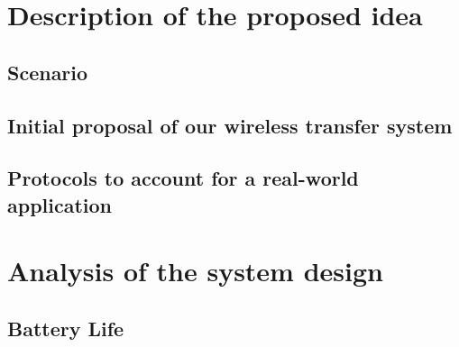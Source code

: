 \documentclass[a4paper, 10pt]{article}
\begin{document}


\section{Description of the proposed idea}
\label{sec:idea}


\subsection{Scenario}
\label{sec:scenario}


\subsection{Initial proposal of our wireless transfer system}
\label{sec:realize}


\subsection{Protocols to account for a real-world application}
\label{sec:proto}



\section{Analysis of the system design}
\label{sec:analysis}


\subsection{Battery Life}
\label{sec:battery}

\end{document}
